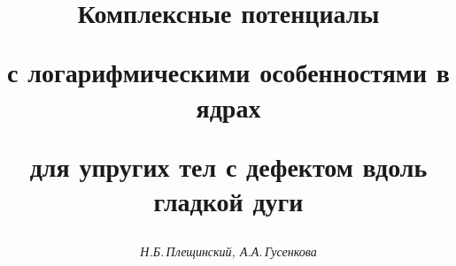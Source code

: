 




% 





\newcommand{\re}{\operatorname{Re}}


\newcommand{\im}{\operatorname{Im}}


\newcommand{\tts}[1]{}







\setcounter{page}{57}















\author{\it Н.Б.\,Плещинский, А.А.\,Гусенкова}




\title{Комплексные потенциалы


с логарифмическими особенностями в ядрах


для упругих тел с дефектом вдоль гладкой дуги}





\date{}




\pagestyle{plain} %







\maketitle


